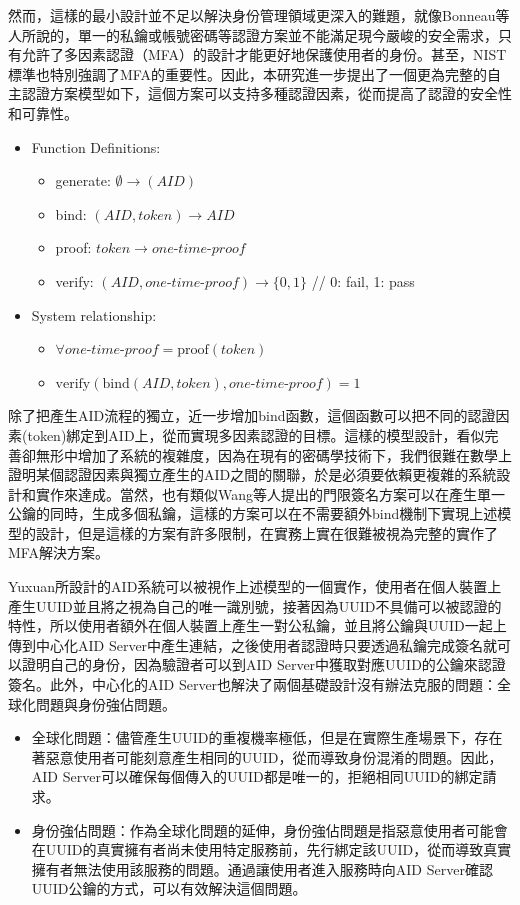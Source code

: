 然而，這樣的最小設計並不足以解決身份管理領域更深入的難題，就像Bonneau\cite{bonneau2012mfa}等人所說的，單一的私鑰或帳號密碼等認證方案並不能滿足現今嚴峻的安全需求，只有允許了多因素認證（MFA）的設計才能更好地保護使用者的身份。甚至，NIST標準也特別強調了MFA的重要性\cite{NIST800-63-3}。因此，本研究進一步提出了一個更為完整的自主認證方案模型如下，這個方案可以支持多種認證因素，從而提高了認證的安全性和可靠性。
\begin{itemize}
  \item Function Definitions:
  \begin{itemize}
      \item generate: $\emptyset \rightarrow (AID)$
      \item bind: $(AID, token) \rightarrow AID$
      \item proof: $token \rightarrow one\text{-}time\text{-}proof$
      \item verify: $(AID, one\text{-}time\text{-}proof) \rightarrow \{0,1\}$ \hfill // 0: fail, 1: pass
  \end{itemize}
  \item System relationship:
  \begin{itemize}
      \item $\forall one\text{-}time\text{-}proof = \text{proof}(token)$
      \item $\text{verify}(\text{bind}(AID, token), one\text{-}time\text{-}proof) = 1$
  \end{itemize}
\end{itemize}
除了把產生AID流程的獨立，近一步增加bind函數，這個函數可以把不同的認證因素(token)綁定到AID上，從而實現多因素認證的目標。這樣的模型設計，看似完善卻無形中增加了系統的複雜度，因為在現有的密碼學技術下，我們很難在數學上證明某個認證因素與獨立產生的AID之間的關聯，於是必須要依賴更複雜的系統設計和實作來達成。當然，也有類似Wang等人\cite{Wang2013ThresholdSignatureSchemes}提出的門限簽名方案可以在產生單一公鑰的同時，生成多個私鑰，這樣的方案可以在不需要額外bind機制下實現上述模型的設計，但是這樣的方案有許多限制，在實務上實在很難被視為完整的實作了MFA解決方案。

Yuxuan所設計的AID系統\cite{ntu-lin2014autonomous}可以被視作上述模型的一個實作，使用者在個人裝置上產生UUID\cite{uuid}並且將之視為自己的唯一識別號，接著因為UUID不具備可以被認證的特性，所以使用者額外在個人裝置上產生一對公私鑰，並且將公鑰與UUID一起上傳到中心化AID Server中產生連結，之後使用者認證時只要透過私鑰完成簽名就可以證明自己的身份，因為驗證者可以到AID Server中獲取對應UUID的公鑰來認證簽名。此外，中心化的AID Server也解決了兩個基礎設計沒有辦法克服的問題：全球化問題與身份強佔問題。
\begin{itemize}
  \item 全球化問題：儘管產生UUID的重複機率極低，但是在實際生產場景下，存在著惡意使用者可能刻意產生相同的UUID，從而導致身份混淆的問題。因此，AID Server可以確保每個傳入的UUID都是唯一的，拒絕相同UUID的綁定請求。
  \item 身份強佔問題：作為全球化問題的延伸，身份強佔問題是指惡意使用者可能會在UUID的真實擁有者尚未使用特定服務前，先行綁定該UUID，從而導致真實擁有者無法使用該服務的問題。通過讓使用者進入服務時向AID Server確認UUID公鑰的方式，可以有效解決這個問題。
\end{itemize}

